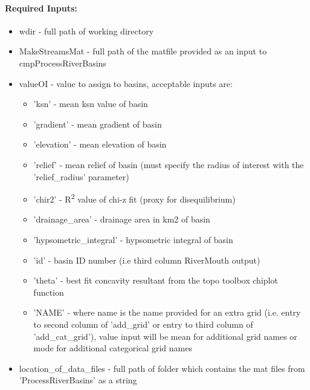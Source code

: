 \paragraph{Required Inputs:}
\begin{itemize}
\item wdir - full path of working directory
\item MakeStreamsMat - full path of the matfile provided as an input to cmpProcessRiverBasins
\item valueOI - value to assign to basins, acceptable inputs are:
\begin{itemize}
\item 'ksn' - mean ksn value of basin
\item 'gradient' - mean gradient of basin
\item 'elevation' - mean elevation of basin
\item 'relief' - mean relief of basin (must specify the radius of interest with the 'relief\_radius' parameter)
\item 'chir2' - R\textsuperscript{2} value of chi-z fit (proxy for disequilibrium)
\item 'drainage\_area' - drainage area in km2 of basin
\item 'hypsometric\_integral' - hypsometric integral of basin
\item 'id' - basin ID number (i.e third column RiverMouth output)
\item 'theta' - best fit concavity resultant from the topo toolbox chiplot function 
\item 'NAME' - where name is the name provided for an extra grid (i.e. entry to second column of 'add\_grid' or entry to 
third column of 'add\_cat\_grid'), value input will be mean for additional grid names or mode for additional 
categorical grid names
\end{itemize}
\item location\_of\_data\_files - full path of folder which contains the mat files from 'ProcessRiverBasins' as a string
\end{itemize}

